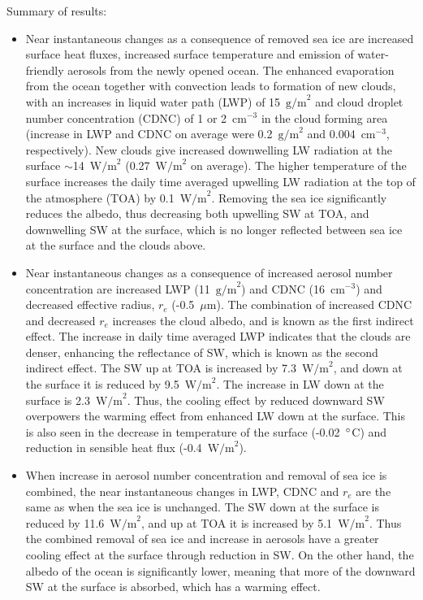 Summary of results:
\begin{itemize}
\item Near instantaneous changes as a consequence of removed sea ice are increased surface heat fluxes, increased surface temperature and emission of water-friendly aerosols from the newly opened ocean. The enhanced evaporation from the ocean together with convection leads to formation of new clouds, with an increases in liquid water path (LWP) of 15~$\text{g/m}^2$ and cloud droplet number concentration (CDNC) of 1 or 2~$\text{cm}^{-3}$ in the cloud forming area (increase in LWP and CDNC on average were 0.2~$\text{g/m}^2$ and 0.004~$\text{cm}^{-3}$, respectively). New clouds give increased downwelling LW radiation at the surface $\sim$14~$\text{W/m}^2$ (0.27~$\text{W/m}^2$ on average). The higher temperature of the surface increases the daily time averaged upwelling LW radiation at the top of the atmosphere (TOA) by 0.1~$\text{W/m}^2$. Removing the sea ice significantly reduces the albedo, thus decreasing both upwelling SW at TOA, and downwelling SW at the surface, which is no longer reflected between sea ice at the surface and the clouds above.
\item Near instantaneous changes as a consequence of increased aerosol number concentration are increased LWP (11~$\text{g/m}^2$) and CDNC (16~$\text{cm}^{-3}$) and decreased effective radius, $r_e$ (-0.5~$\mu\text{m}$). The combination of increased CDNC and decreased $r_e$ increases the cloud albedo, and is known as the first indirect effect. The increase in daily time averaged LWP indicates that the clouds are denser, enhancing the reflectance of SW, which is known as the second indirect effect. The SW up at TOA is increased by 7.3~$\text{W/m}^2$, and down at the surface it is reduced by 9.5~$\text{W/m}^2$. The increase in LW down at the surface is 2.3~$\text{W/m}^2$. Thus, the cooling effect by reduced downward SW overpowers the warming effect from enhanced LW down at the surface. This is also seen in the decrease in temperature of the surface (-0.02~$\degree$C) and reduction in sensible heat flux (-0.4~$\text{W/m}^2$).
\item When increase in aerosol number concentration and removal of sea ice is combined, the near instantaneous changes in LWP, CDNC and $r_e$ are the same as when the sea ice is unchanged. The SW down at the surface is reduced by 11.6~$\text{W/m}^2$, and up at TOA it is increased by 5.1~$\text{W/m}^2$. Thus the combined removal of sea ice and increase in aerosols have a greater cooling effect at the surface through reduction in SW. On the other hand, the albedo of the ocean is significantly lower, meaning that more of the downward SW at the surface is absorbed, which has a warming effect.

\end{itemize}
